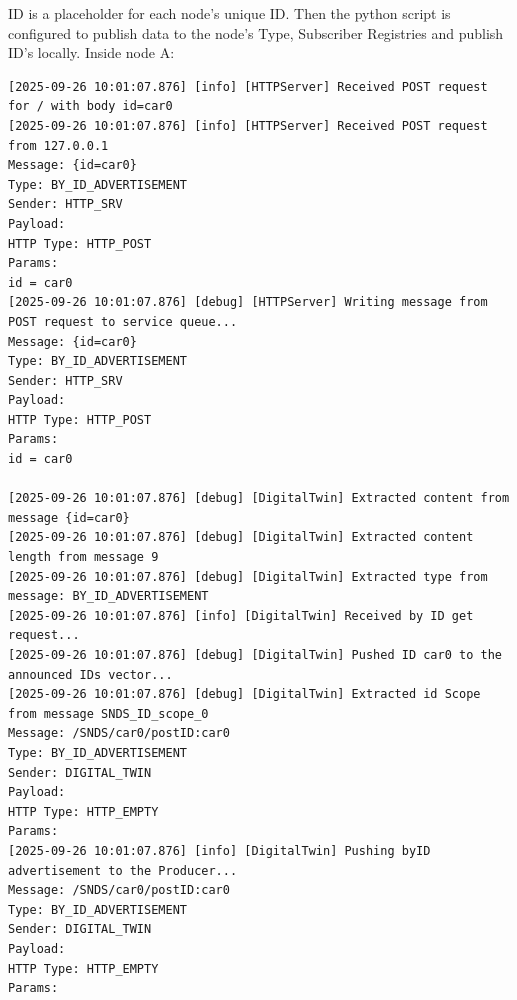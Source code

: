 \documentclass{article}
\begin{document}
ID is a placeholder for each node's unique ID. Then the python script is configured to publish data to the node's Type, Subscriber Registries and publish ID's locally. Inside node A:

\begin{lstlisting}[language=log,caption={Configured publish operations for each Node},label={lst:local-publish-inside-a}]
[2025-09-26 10:01:07.876] [info] [HTTPServer] Received POST request for / with body id=car0
[2025-09-26 10:01:07.876] [info] [HTTPServer] Received POST request from 127.0.0.1
Message: {id=car0}
Type: BY_ID_ADVERTISEMENT
Sender: HTTP_SRV
Payload: 
HTTP Type: HTTP_POST
Params:
id = car0
[2025-09-26 10:01:07.876] [debug] [HTTPServer] Writing message from POST request to service queue...
Message: {id=car0}
Type: BY_ID_ADVERTISEMENT
Sender: HTTP_SRV
Payload: 
HTTP Type: HTTP_POST
Params:
id = car0

[2025-09-26 10:01:07.876] [debug] [DigitalTwin] Extracted content from message {id=car0}
[2025-09-26 10:01:07.876] [debug] [DigitalTwin] Extracted content length from message 9
[2025-09-26 10:01:07.876] [debug] [DigitalTwin] Extracted type from message: BY_ID_ADVERTISEMENT
[2025-09-26 10:01:07.876] [info] [DigitalTwin] Received by ID get request...
[2025-09-26 10:01:07.876] [debug] [DigitalTwin] Pushed ID car0 to the announced IDs vector...
[2025-09-26 10:01:07.876] [debug] [DigitalTwin] Extracted id Scope from message SNDS_ID_scope_0
Message: /SNDS/car0/postID:car0
Type: BY_ID_ADVERTISEMENT
Sender: DIGITAL_TWIN
Payload: 
HTTP Type: HTTP_EMPTY
Params:
[2025-09-26 10:01:07.876] [info] [DigitalTwin] Pushing byID advertisement to the Producer...
Message: /SNDS/car0/postID:car0
Type: BY_ID_ADVERTISEMENT
Sender: DIGITAL_TWIN
Payload: 
HTTP Type: HTTP_EMPTY
Params:


\end{lstlisting}
\end{document}
